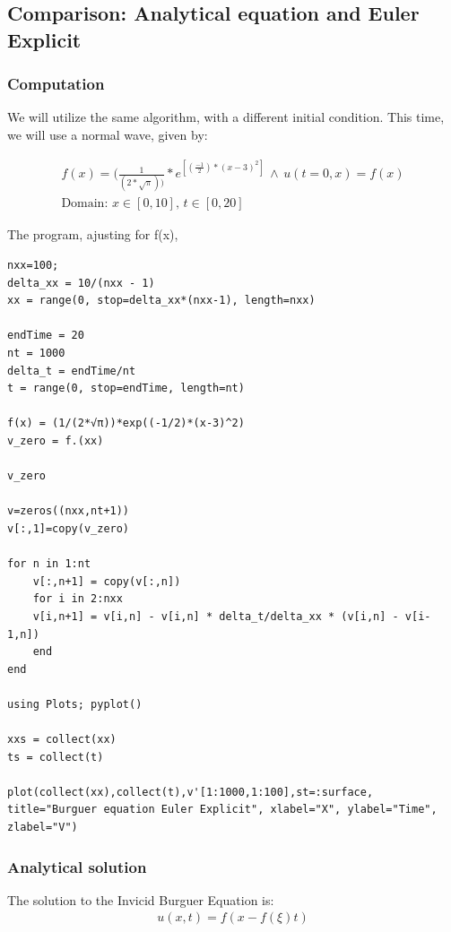 \documentclass[11pt]{article}
\begin{document}
\subsection{Comparison: Analytical equation and Euler Explicit}
\label{sec:org7895e77}
\subsubsection{Computation}
\label{sec:org816223d}

We will utilize the same algorithm, with a different initial condition. This
time, we will use a normal wave, given by:

\begin{equation}
\begin{aligned}
f(x) = (\frac{1}{(2*\sqrt{\pi}))}*e^{[(\frac{-1}{2})*(x-3)^2]} \, \land \, u(t=0,x) = f(x) \\
\text{Domain: } x \in [0,10], \, t \in [0,20]
\end{aligned}
\end{equation}

The program, ajusting for f(x),

\begin{verbatim}
nxx=100;
delta_xx = 10/(nxx - 1)
xx = range(0, stop=delta_xx*(nxx-1), length=nxx) 

endTime = 20  
nt = 1000    
delta_t = endTime/nt  
t = range(0, stop=endTime, length=nt)

f(x) = (1/(2*√π))*exp((-1/2)*(x-3)^2)
v_zero = f.(xx) 

v_zero

v=zeros((nxx,nt+1))
v[:,1]=copy(v_zero)

for n in 1:nt  
    v[:,n+1] = copy(v[:,n]) 
    for i in 2:nxx  
	v[i,n+1] = v[i,n] - v[i,n] * delta_t/delta_xx * (v[i,n] - v[i-1,n])
    end
end

using Plots; pyplot()

xxs = collect(xx)
ts = collect(t)

plot(collect(xx),collect(t),v'[1:1000,1:100],st=:surface, title="Burguer equation Euler Explicit", xlabel="X", ylabel="Time", zlabel="V")
\end{verbatim}

\subsubsection{Analytical solution}
\label{sec:org228e512}
The solution to the Invicid Burguer Equation is:
\begin{equation}
\begin{aligned}
u(x,t) = f(x - f(\xi)t)
\end{aligned}
\end{equation}
\end{document}
